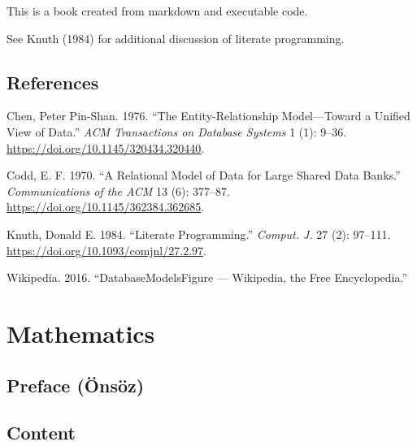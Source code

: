 \documentclass[
  letterpaper,
  DIV=11,
  numbers=noendperiod]{scrreprt}
\newlength{\cslhangindent}
\newenvironment{CSLReferences}[2] %
 {\begin{list}{}{%
  \setlength{\itemindent}{0pt}
  \setlength{\leftmargin}{0pt}
  \setlength{\parsep}{0pt}
  \ifodd #1
   \setlength{\leftmargin}{\cslhangindent}
   \setlength{\itemindent}{-1\cslhangindent}
  \fi
  \setlength{\itemsep}{#2\baselineskip}}}
 {\end{list}}
\begin{document}
This is a book created from markdown and executable code.

See Knuth (1984) for additional discussion of literate programming.


\chapter*{References}\label{references}


\label{refs}
\begin{CSLReferences}{1}{0}
Chen, Peter Pin-Shan. 1976. {``The Entity-Relationship Model---Toward a
Unified View of Data.''} \emph{ACM Transactions on Database Systems} 1
(1): 9--36. \url{https://doi.org/10.1145/320434.320440}.

Codd, E. F. 1970. {``A Relational Model of Data for Large Shared Data
Banks.''} \emph{Communications of the ACM} 13 (6): 377--87.
\url{https://doi.org/10.1145/362384.362685}.

Knuth, Donald E. 1984. {``Literate Programming.''} \emph{Comput. J.} 27
(2): 97--111. \url{https://doi.org/10.1093/comjnl/27.2.97}.

Wikipedia. 2016. {``DatabaseModelsFigure --- Wikipedia{,} the Free
Encyclopedia.''}

\end{CSLReferences}

\part{Mathematics}

\chapter*{Preface (Önsöz)}\label{preface-uxf6nsuxf6z-1}


\chapter*{Content}\label{content-1}
\end{document}
